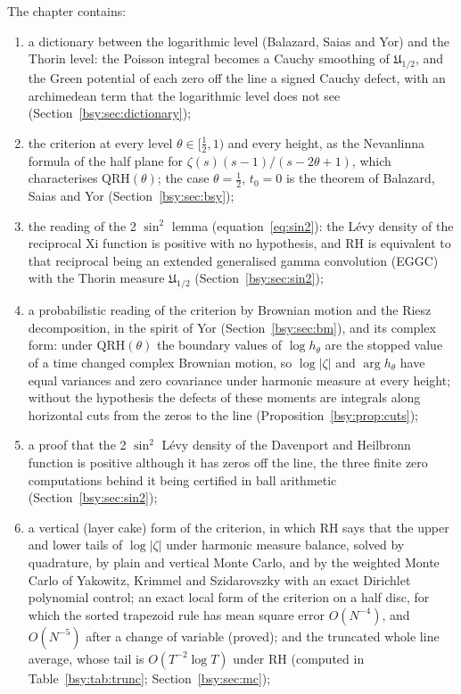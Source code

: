 The chapter contains:
\begin{enumerate}\setlength{\itemsep}{1pt}
\item a dictionary between the logarithmic level (Balazard, Saias and Yor) and the Thorin level: the Poisson integral becomes a Cauchy smoothing of $\mathfrak U_{1/2}$, and the Green potential of each zero off the line a signed Cauchy defect, with an archimedean term that the logarithmic level does not see (Section~\ref{bsy:sec:dictionary});
\item the criterion at every level $\theta\in[\frac12,1)$ and every height, as the Nevanlinna formula of the half plane for $\zeta(s)(s-1)/(s-2\theta+1)$, which characterises $\mathrm{QRH}(\theta)$; the case $\theta=\frac12$, $t_0=0$ is the theorem of Balazard, Saias and Yor (Section~\ref{bsy:sec:bsy});
\item the reading of the 2 $\sin^2$ lemma (equation~\eqref{eq:sin2}): the L\'evy density of the reciprocal Xi function is positive with no hypothesis, and RH is equivalent to that reciprocal being an extended generalised gamma convolution (EGGC) with the Thorin measure $\mathfrak U_{1/2}$ (Section~\ref{bsy:sec:sin2});
\item a probabilistic reading of the criterion by Brownian motion and the Riesz decomposition, in the spirit of Yor (Section~\ref{bsy:sec:bm}), and its complex form: under $\mathrm{QRH}(\theta)$ the boundary values of $\log h_\theta$ are the stopped value of a time changed complex Brownian motion, so $\log|\zeta|$ and $\arg h_\theta$ have equal variances and zero covariance under harmonic measure at every height; without the hypothesis the defects of these moments are integrals along horizontal cuts from the zeros to the line (Proposition~\ref{bsy:prop:cuts});
\item a proof that the 2 $\sin^2$ L\'evy density of the Davenport and Heilbronn function is positive although it has zeros off the line, the three finite zero computations behind it being certified in ball arithmetic (Section~\ref{bsy:sec:sin2});
\item a vertical (layer cake) form of the criterion, in which RH says that the upper and lower tails of $\log|\zeta|$ under harmonic measure balance, solved by quadrature, by plain and vertical Monte Carlo, and by the weighted Monte Carlo of Yakowitz, Krimmel and Szidarovszky with an exact Dirichlet polynomial control; an exact local form of the criterion on a half disc, for which the sorted trapezoid rule has mean square error $O(N^{-4})$, and $O(N^{-5})$ after a change of variable (proved); and the truncated whole line average, whose tail is $O(T^{-2}\log T)$ under RH \cite{BLM14} (computed in Table~\ref{bsy:tab:trunc}; Section~\ref{bsy:sec:mc});

\end{enumerate}
